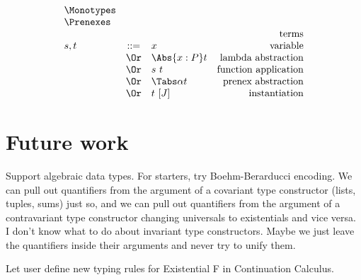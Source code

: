 \documentclass{amsart}
\begin{document}
\[
\begin{array}{lclr}
\Monotypes\\
\Prenexes
\\
&&&\mbox{terms}\\
s, t
& ::= & x & \mbox{variable} \\
&\Or& \Abs{x:P}t  & \mbox{lambda abstraction} \\
&\Or& s~t & \mbox{function application} \\
&\Or& \Tabs\alpha t & \mbox{prenex abstraction} \\
&\Or& t~[J] & \mbox{instantiation} \\
\end{array}
\]


\section{Future work}

Support algebraic data types.
%
For starters, try Boehm-Berarducci encoding.
%
We can pull out quantifiers from the argument of a covariant type
constructor (lists, tuples, sums) just so, and we can pull out
quantifiers from the argument of a contravariant type constructor
changing universals to existentials and vice versa. I don't know
what to do about invariant type constructors. Maybe we just leave
the quantifiers inside their arguments and never try to unify
them.

Let user define new typing rules for Existential F in
Continuation Calculus.
\end{document}
